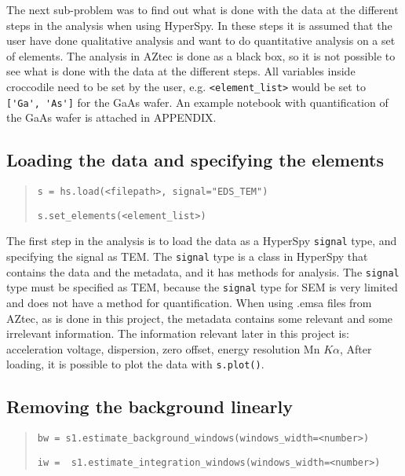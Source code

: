 The next sub-problem was to find out what is done with the data at the different steps in the analysis when using HyperSpy.
In these steps it is assumed that the user have done qualitative analysis and want to do quantitative analysis on a set of elements.
The analysis in AZtec is done as a black box, so it is not possible to see what is done with the data at the different steps.
All variables inside croccodile need to be set by the user, e.g. \verb|<element_list>| would be set to \verb|['Ga', 'As']| for the GaAs wafer.
An example notebook with quantification of the GaAs wafer is attached in APPENDIX.

\subsection{Loading the data and specifying the elements}
\label{sec:results:steps:load}
\begin{quote}
    \verb|s = hs.load(<filepath>, signal="EDS_TEM")|

    \verb|s.set_elements(<element_list>)|
\end{quote}

The first step in the analysis is to load the data as a HyperSpy \verb|signal| type, and specifying the signal as TEM.
The \verb|signal| type is a class in HyperSpy that contains the data and the metadata, and it has methods for analysis.
The \verb|signal| type must be specified as TEM, because the \verb|signal| type for SEM is very limited and does not have a method for quantification.
When using .emsa files from AZtec, as is done in this project, the metadata contains some relevant and some irrelevant information.
The information relevant later in this project is:
acceleration voltage, dispersion, zero offset, energy resolution Mn $K\alpha$,
After loading, it is possible to plot the data with \verb|s.plot()|.

\subsection{Removing the background linearly}
\label{sec:results:steps:background}
\begin{quote}
    \verb|bw = s1.estimate_background_windows(windows_width=<number>)|

    \verb|iw =  s1.estimate_integration_windows(windows_width=<number>)|
\end{quote}

